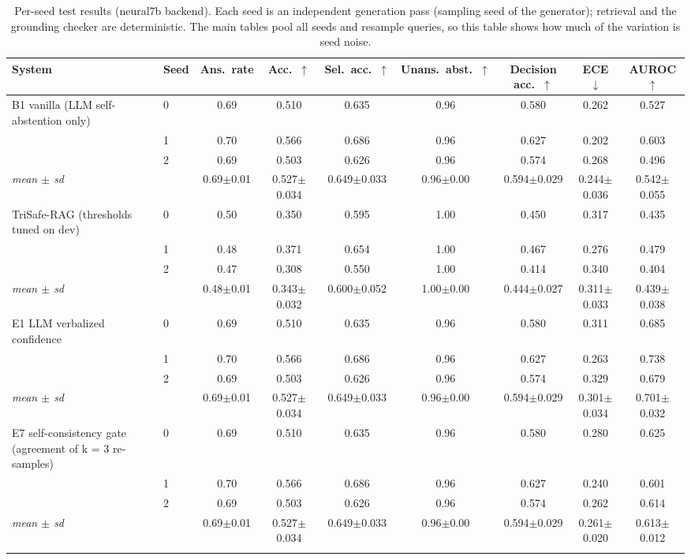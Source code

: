 \begin{table}[t]
  \caption{Per-seed test results (neural7b backend). Each seed is an independent generation pass (sampling seed of the generator); retrieval and the grounding checker are deterministic. The main tables pool all seeds and resample queries, so this table shows how much of the variation is seed noise.}
  \label{tab:seeds-neural7b}
  \footnotesize
  \setlength{\tabcolsep}{4pt}
  \begin{tabular}{llccccccc}
    \toprule
    System & Seed & Ans.\ rate & Acc.\ $\uparrow$ & Sel.\ acc.\ $\uparrow$ & Unans.\ abst.\ $\uparrow$ & Decision acc.\ $\uparrow$ & ECE $\downarrow$ & AUROC $\uparrow$ \\
    \midrule
    B1 vanilla (LLM self-abstention only) & 0 & 0.69 & 0.510 & 0.635 & 0.96 & 0.580 & 0.262 & 0.527 \\
     & 1 & 0.70 & 0.566 & 0.686 & 0.96 & 0.627 & 0.202 & 0.603 \\
     & 2 & 0.69 & 0.503 & 0.626 & 0.96 & 0.574 & 0.268 & 0.496 \\
    \quad \emph{mean $\pm$ sd} & & 0.69$\pm$0.01 & 0.527$\pm$0.034 & 0.649$\pm$0.033 & 0.96$\pm$0.00 & 0.594$\pm$0.029 & 0.244$\pm$0.036 & 0.542$\pm$0.055 \\
    \addlinespace
    TriSafe-RAG (thresholds tuned on dev) & 0 & 0.50 & 0.350 & 0.595 & 1.00 & 0.450 & 0.317 & 0.435 \\
     & 1 & 0.48 & 0.371 & 0.654 & 1.00 & 0.467 & 0.276 & 0.479 \\
     & 2 & 0.47 & 0.308 & 0.550 & 1.00 & 0.414 & 0.340 & 0.404 \\
    \quad \emph{mean $\pm$ sd} & & 0.48$\pm$0.01 & 0.343$\pm$0.032 & 0.600$\pm$0.052 & 1.00$\pm$0.00 & 0.444$\pm$0.027 & 0.311$\pm$0.033 & 0.439$\pm$0.038 \\
    \addlinespace
    E1 LLM verbalized confidence & 0 & 0.69 & 0.510 & 0.635 & 0.96 & 0.580 & 0.311 & 0.685 \\
     & 1 & 0.70 & 0.566 & 0.686 & 0.96 & 0.627 & 0.263 & 0.738 \\
     & 2 & 0.69 & 0.503 & 0.626 & 0.96 & 0.574 & 0.329 & 0.679 \\
    \quad \emph{mean $\pm$ sd} & & 0.69$\pm$0.01 & 0.527$\pm$0.034 & 0.649$\pm$0.033 & 0.96$\pm$0.00 & 0.594$\pm$0.029 & 0.301$\pm$0.034 & 0.701$\pm$0.032 \\
    \addlinespace
    E7 self-consistency gate (agreement of k = 3 re-samples) & 0 & 0.69 & 0.510 & 0.635 & 0.96 & 0.580 & 0.280 & 0.625 \\
     & 1 & 0.70 & 0.566 & 0.686 & 0.96 & 0.627 & 0.240 & 0.601 \\
     & 2 & 0.69 & 0.503 & 0.626 & 0.96 & 0.574 & 0.262 & 0.614 \\
    \quad \emph{mean $\pm$ sd} & & 0.69$\pm$0.01 & 0.527$\pm$0.034 & 0.649$\pm$0.033 & 0.96$\pm$0.00 & 0.594$\pm$0.029 & 0.261$\pm$0.020 & 0.613$\pm$0.012 \\
    \addlinespace
    \bottomrule
  \end{tabular}
\end{table}
